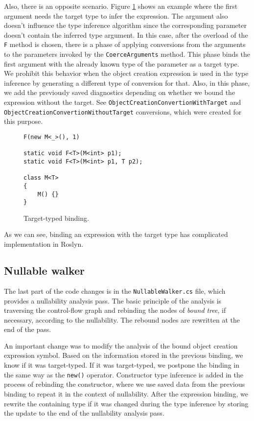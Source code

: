 Also, there is an opposite scenario. 
Figure \ref{img72:targetBinding} shows an example where the first argument needs the target type to infer the expression. 
The argument also doesn’t influence the type inference algorithm since the corresponding parameter doesn’t contain the inferred type argument. 
In this case, after the overload of the \texttt{F} method is chosen, there is a phase of applying conversions from the arguments to the parameters invoked by the \texttt{CoerceArguments} method. 
This phase binds the first argument with the already known type of the parameter as a target type.
We prohibit this behavior when the object creation expression is used in the type inference by generating a different type of conversion for that. 
Also, in this phase, we add the previously saved diagnostics depending on whether we bound the expression without the target. 
See \texttt{ObjectCreationConvertionWithTarget} and \texttt{ObjectCreationConvertionWithoutTarget} conversions, which were created for this purpose.
\begin{figure}[h]
\begin{lstlisting}[style=csharp, showstringspaces=false]
F(new M<_>(), 1)

static void F<T>(M<int> p1);
static void F<T>(M<int> p1, T p2);

class M<T> 
{
    M() {}
}
\end{lstlisting}
\caption{Target-typed binding.}
\label{img72:targetBinding}
\end{figure}
\par
As we can see, binding an expression with the target type has complicated implementation in Roslyn.

\subsection{Nullable walker}

The last part of the code changes is in the \texttt{NullableWalker.cs} file, which provides a nullability analysis pass. 
The basic principle of the analysis is traversing the control-flow graph and rebinding the nodes of \textit{bound tree}, if necessary, according to the nullability. 
The rebound nodes are rewritten at the end of the pass.
\par
An important change was to modify the analysis of the bound object creation expression symbol. 
Based on the information stored in the previous binding, we know if it was target-typed. 
If it was target-typed, we postpone the binding in the same way as the \texttt{new()} operator. 
Constructor type inference is added in the process of rebinding the constructor, where we use saved data from the previous binding to repeat it in the context of nullability. 
After the expression binding, we rewrite the containing type if it was changed during the type inference by storing the update to the end of the nullability analysis pass.